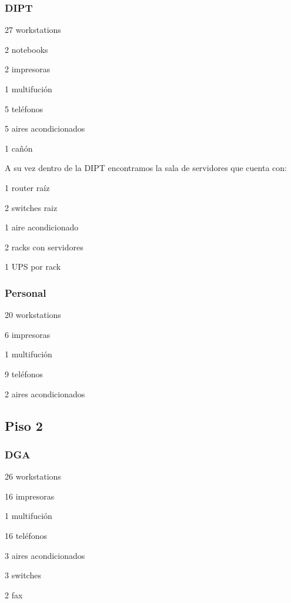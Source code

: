 \documentclass[a4paper,11pt,oneside]{article}
\begin{document}
\subsubsection*{DIPT}
%
\begin{itemize*}
\item 27 workstations
\item 2 notebooks
\item 2 impresoras
\item 1 multifución
\item 5 teléfonos
\item 5 aires acondicionados
\item 1 cañón
\end{itemize*}
%
A su vez dentro de la DIPT encontramos la sala de servidores que cuenta con:
\begin{itemize*}
\item 1 router raíz
\item 2 switches raiz
\item 1 aire acondicionado
\item 2 racks con servidores
\item 1 UPS por rack
\end{itemize*}
%
\subsubsection*{Personal}
\begin{itemize*}
\item 20 workstations
\item 6 impresoras
\item 1 multifución
\item 9 teléfonos
\item 2 aires acondicionados
\end{itemize*}
%
\subsection*{Piso 2}
%
\subsubsection*{DGA}
\begin{itemize*}
\item 26 workstations
\item 16 impresoras
\item 1 multifución
\item 16 teléfonos
\item 3 aires acondicionados
\item 3 switches
\item 2 fax
\end{itemize*}
%
\end{document}
